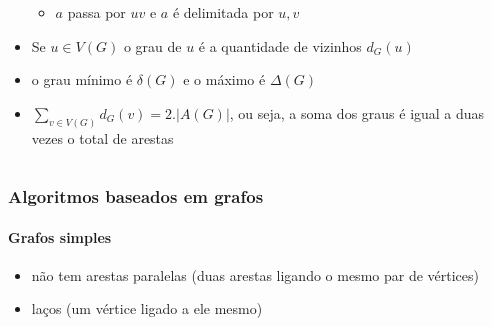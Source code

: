 \begin{frame}
\begin{columns}
\begin{column}{0.7\textwidth}
\begin{itemize}
\begin{itemize}
					\item $a$ passa por $uv$ e $a$ é delimitada por $u, v$
				\end{itemize}
				\item Se $u \in V(G)$ o grau de $u$ é a quantidade de vizinhos $d_G(u)$
				\item o grau mínimo é $\delta(G)$ e o máximo é $\Delta(G)$
				 \item $\sum_{v \in V(G)} d_G(v) = 2.|A(G)|$, ou seja, a soma dos graus é igual a duas vezes o total de arestas 
			\end{itemize}
		\end{column}
	\end{columns}
\end{frame}

\begin{frame}
	\frametitle{Algoritmos baseados em grafos}
	\framesubtitle{Grafos simples}
	\begin{itemize}
		\item não tem arestas paralelas (duas arestas ligando o mesmo par de vértices)
		\item laços (um vértice ligado a ele mesmo)
	\end{itemize}
\end{frame}

